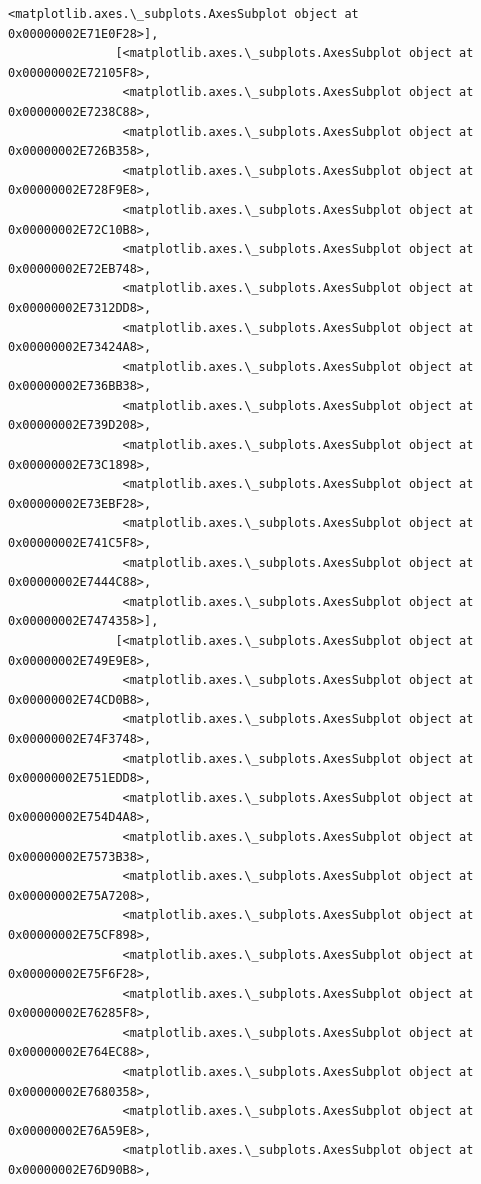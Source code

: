 \documentclass[11pt]{article}
\begin{document}
\begin{Verbatim}[commandchars=\\\{\}]
                <matplotlib.axes.\_subplots.AxesSubplot object at 0x00000002E71E0F28>],
               [<matplotlib.axes.\_subplots.AxesSubplot object at 0x00000002E72105F8>,
                <matplotlib.axes.\_subplots.AxesSubplot object at 0x00000002E7238C88>,
                <matplotlib.axes.\_subplots.AxesSubplot object at 0x00000002E726B358>,
                <matplotlib.axes.\_subplots.AxesSubplot object at 0x00000002E728F9E8>,
                <matplotlib.axes.\_subplots.AxesSubplot object at 0x00000002E72C10B8>,
                <matplotlib.axes.\_subplots.AxesSubplot object at 0x00000002E72EB748>,
                <matplotlib.axes.\_subplots.AxesSubplot object at 0x00000002E7312DD8>,
                <matplotlib.axes.\_subplots.AxesSubplot object at 0x00000002E73424A8>,
                <matplotlib.axes.\_subplots.AxesSubplot object at 0x00000002E736BB38>,
                <matplotlib.axes.\_subplots.AxesSubplot object at 0x00000002E739D208>,
                <matplotlib.axes.\_subplots.AxesSubplot object at 0x00000002E73C1898>,
                <matplotlib.axes.\_subplots.AxesSubplot object at 0x00000002E73EBF28>,
                <matplotlib.axes.\_subplots.AxesSubplot object at 0x00000002E741C5F8>,
                <matplotlib.axes.\_subplots.AxesSubplot object at 0x00000002E7444C88>,
                <matplotlib.axes.\_subplots.AxesSubplot object at 0x00000002E7474358>],
               [<matplotlib.axes.\_subplots.AxesSubplot object at 0x00000002E749E9E8>,
                <matplotlib.axes.\_subplots.AxesSubplot object at 0x00000002E74CD0B8>,
                <matplotlib.axes.\_subplots.AxesSubplot object at 0x00000002E74F3748>,
                <matplotlib.axes.\_subplots.AxesSubplot object at 0x00000002E751EDD8>,
                <matplotlib.axes.\_subplots.AxesSubplot object at 0x00000002E754D4A8>,
                <matplotlib.axes.\_subplots.AxesSubplot object at 0x00000002E7573B38>,
                <matplotlib.axes.\_subplots.AxesSubplot object at 0x00000002E75A7208>,
                <matplotlib.axes.\_subplots.AxesSubplot object at 0x00000002E75CF898>,
                <matplotlib.axes.\_subplots.AxesSubplot object at 0x00000002E75F6F28>,
                <matplotlib.axes.\_subplots.AxesSubplot object at 0x00000002E76285F8>,
                <matplotlib.axes.\_subplots.AxesSubplot object at 0x00000002E764EC88>,
                <matplotlib.axes.\_subplots.AxesSubplot object at 0x00000002E7680358>,
                <matplotlib.axes.\_subplots.AxesSubplot object at 0x00000002E76A59E8>,
                <matplotlib.axes.\_subplots.AxesSubplot object at 0x00000002E76D90B8>,

\end{Verbatim}
\end{document}
